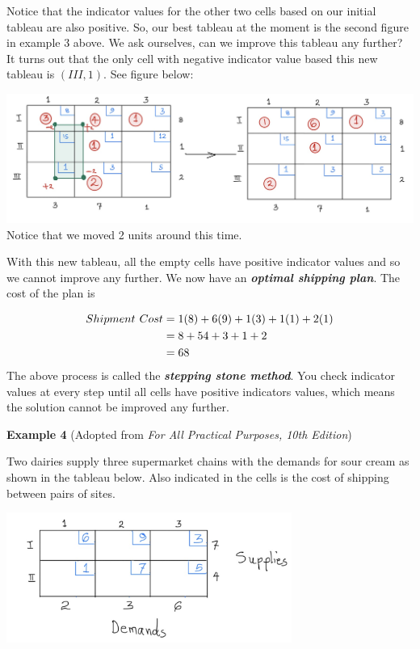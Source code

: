 \documentclass[
  letterpaper,
  DIV=11,
  numbers=noendperiod]{scrreprt}
\begin{document}
Notice that the indicator values for the other two cells based on our
initial tableau are also positive. So, our best tableau at the moment is
the second figure in example 3 above. We ask ourselves, can we improve
this tableau any further? It turns out that the only cell with negative
indicator value based this new tableau is \((III, 1)\). See figure
below:

\includegraphics{images/o.jpeg} Notice that we moved 2 units around this
time.

With this new tableau, all the empty cells have positive indicator
values and so we cannot improve any further. We now have an
\textbf{\emph{optimal shipping plan}}. The cost of the plan is

\[
\begin{aligned}
Shipment \hspace{.05in}Cost&= 1(8)+6(9)+1(3)+1(1)+2(1)\\
&=8+54+3+1+2\\
&=68
\end{aligned}
\] The above process is called the \textbf{\emph{stepping stone
method}}. You check indicator values at every step until all cells have
positive indicators values, which means the solution cannot be improved
any further.

\textbf{Example 4} (Adopted from \emph{For All Practical Purposes, 10th
Edition})

Two dairies supply three supermarket chains with the demands for sour
cream as shown in the tableau below. Also indicated in the cells is the
cost of shipping between pairs of sites.

\includegraphics[width=0.7\textwidth,height=\textheight]{images/p.jpeg}
\end{document}
